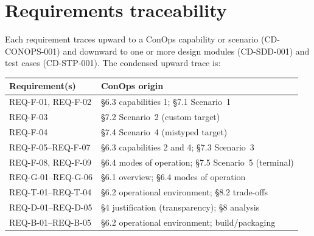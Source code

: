 \documentclass[12pt]{article}
\begin{document}
\section{Requirements traceability}

Each requirement traces upward to a ConOps capability or scenario
(CD-CONOPS-001) and downward to one or more design modules
(CD-SDD-001) and test cases (CD-STP-001).  The condensed upward trace is:

\begin{longtable}{p{}p{}}
\toprule
\textbf{Requirement(s)} & \textbf{ConOps origin} \\
\midrule
REQ-F-01, REQ-F-02 & \S6.3 capabilities 1; \S7.1 Scenario~1 \\
REQ-F-03 & \S7.2 Scenario~2 (custom target) \\
REQ-F-04 & \S7.4 Scenario~4 (mistyped target) \\
REQ-F-05--REQ-F-07 & \S6.3 capabilities 2 and 4; \S7.3 Scenario~3 \\
REQ-F-08, REQ-F-09 & \S6.4 modes of operation; \S7.5 Scenario~5 (terminal) \\
REQ-G-01--REQ-G-06 & \S6.1 overview; \S6.4 modes of operation \\
REQ-T-01--REQ-T-04 & \S6.2 operational environment; \S8.2 trade-offs \\
REQ-D-01--REQ-D-05 & \S4 justification (transparency); \S8 analysis \\
REQ-B-01--REQ-B-05 & \S6.2 operational environment; build/packaging \\
\bottomrule
\end{longtable}
\end{document}
